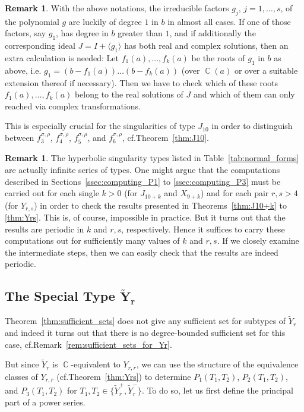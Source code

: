 \documentclass[noend]{amsproc}
\theoremstyle{definition}
\newtheorem{remark}[theorem]{Remark}
\newcommand{\tY}{\widetilde{Y}}
\DeclareMathOperator{\C}{\mathbb{C}}
\begin{document}
\begin{remark}
With the above notations, the irreducible factors $g_j$, $j = 1, \ldots, s$, of
the polynomial $g$ are luckily of degree $1$ in $b$ in almost all cases. If one
of those factors, say $g_1$, has degree in $b$ greater than $1$, and if
additionally the corresponding ideal $J = I + \langle g_1 \rangle$ has both
real and complex solutions, then an extra calculation is needed: Let
$f_1(a), \ldots, f_k(a)$ be the roots of $g_1$ in $b$ as above, i.e.\@
$g_1 = (b-f_1(a)) \ldots (b-f_k(a))$ (over $\C(a)$ or over a suitable extension
thereof if necessary). Then we have to check which of these roots
$f_1(a), \ldots, f_k(a)$ belong to the real solutions of $J$ and which of them
can only reached via complex transformations.

This is especially crucial for the singularities of type $J_{10}$ in order to
distinguish between $f_3^{\sigma,\rho}$, $f_4^{\sigma,\rho}$,
$f_5^{\sigma,\rho}$, and $f_6^{\sigma,\rho}$, cf.\@ Theorem~\ref{thm:J10}.
\end{remark}

\begin{remark}
The hyperbolic singularity types listed in Table~\ref{tab:normal_forms} are
actually infinite series of types. One might argue that the computations
described in Sections~\ref{ssec:computing_P1} to \ref{ssec:computing_P3} must
be carried out for each single $k > 0$ (for $J_{10+k}$ and $X_{9+k}$) and for
each pair $r,s > 4$ (for $Y_{r,s}$) in order to check the results presented in
Theorems~\ref{thm:J10+k} to \ref{thm:Yrs}. This is, of course, impossible in
practice. But it turns out that the results are periodic in $k$ and $r,s$,
respectively. Hence it suffices to carry these computations out for
sufficiently many values of $k$ and $r,s$. If we closely examine the
intermediate steps, then we can easily check that the results are indeed
periodic.
\end{remark}


\subsection{The Special Type $\boldsymbol{\tY_r}$}\label{ssec:Yr}

Theorem~\ref{thm:sufficient_sets} does not give any sufficient set for subtypes
of $\tY_r$ and indeed it turns out that there is no degree-bounded sufficient
set for this case, cf.\@ Remark~\ref{rem:sufficient_sets_for_Yr}.

But since $\tY_r$ is $\C$-equivalent to $Y_{r,r}$, we can use the structure of
the equivalence classes of $Y_{r,r}$ (cf.\@ Theorem~\ref{thm:Yrs}) to determine
$P_1(T_1, T_2)$, $P_2(T_1, T_2)$, and $P_3(T_1, T_2)$ for
$T_1, T_2 \in \bigl\{\tY_r^+, \tY_r^-\bigr\}$. To do so, let us first define
the principal part of a power series.
\end{document}
